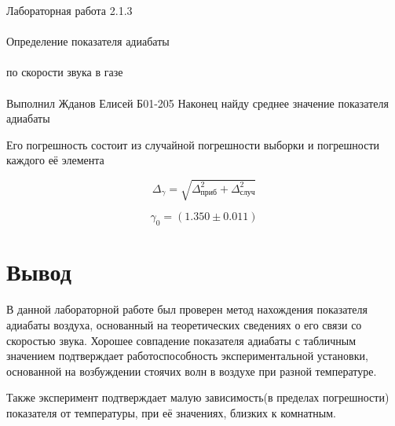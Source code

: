 \documentclass{astroedu-lab}
\begin{document}
\begin{problem}{\huge Лабораторная работа 2.1.3\\\\Определение показателя адиабаты\\\\по скорости звука в газе\\\\Выполнил Жданов Елисей Б01-205}
Наконец найду среднее значение показателя адиабаты

Его погрешность состоит из случайной погрешности выборки и погрешности каждого её элемента

\begin{equation}
	\Delta_\gamma = \sqrt{\Delta_\text{приб}^2 + \Delta_\text{случ}^2}
\end{equation}

\begin{equation}
	\boxed{\gamma_0 = (1.350 \pm 0.011)}
\end{equation}




\section{Вывод}

В данной лабораторной работе был проверен метод нахождения показателя адиабаты воздуха, основанный на теоретических сведениях о его связи со скоростью звука. Хорошее совпадение показателя адиабаты с табличным значением подтверждает работоспособность экспериментальной установки, основанной на возбуждении стоячих волн в воздухе при разной температуре.

Также эксперимент подтверждает малую зависимость(в пределах погрешности) показателя от температуры, при её значениях, близких к комнатным.

\end{problem}
\end{document}
